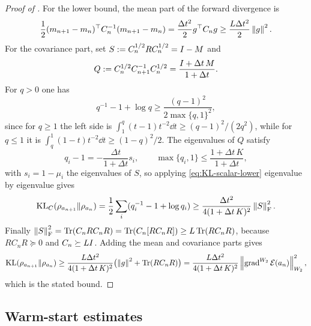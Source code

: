\begin{proof}[Proof of ]
    For the lower bound, the mean part of the forward divergence is
    \begin{equation*}
        \frac12(m_{n+1}-m_n)^\top C_n^{-1}(m_{n+1}-m_n)
        =\frac{\Delta t^2}2g^\top C_ng
        \geq\frac{L\Delta t^2}2\left\lVert g\right\rVert^2 .
    \end{equation*}
    For the covariance part, set $S:=C_n^{1/2}RC_n^{1/2}=I-M$ and
    \begin{equation*}
        Q:=C_n^{1/2}C_{n+1}^{-1}C_n^{1/2}=\frac{I+\Delta t\,M}{1+\Delta t}.
    \end{equation*}
    For $q>0$ one has
    \begin{equation}\label{eq:KL-scalar-lower}
        q^{-1}-1+\log q\geq\frac{(q-1)^2}{2\max\{q,1\}^2},
    \end{equation}
    since for $q\geq1$ the left side is $\int_1^q(t-1)t^{-2}\dd t\geq(q-1)^2/(2q^2)$, while for
    $q\leq1$ it is $\int_q^1(1-t)t^{-2}\dd t\geq(1-q)^2/2$. The eigenvalues of $Q$ satisfy
    \begin{equation*}
        q_i-1=-\frac{\Delta t}{1+\Delta t}s_i,
        \qquad
        \max\{q_i,1\}\leq\frac{1+\Delta t\,K}{1+\Delta t},
    \end{equation*}
    with $s_i=1-\mu_i$ the eigenvalues of $S$, so applying \eqref{eq:KL-scalar-lower}
    eigenvalue by eigenvalue gives
    \begin{equation*}
        \mathrm{KL}_C(\rho_{a_{n+1}}\|\rho_{a_n})
        =\frac12\sum_i(q_i^{-1}-1+\log q_i)
        \geq\frac{\Delta t^2}{4(1+\Delta t\,K)^2}\left\lVert S\right\rVert_{\mathrm{F}}^2 .
    \end{equation*}
    Finally $\left\lVert S\right\rVert_{\mathrm{F}}^2=\operatorname{Tr}(C_nRC_nR)=\operatorname{Tr}(C_n[RC_nR])\geq L\operatorname{Tr}(RC_nR)$, because
    $RC_nR\succeq0$ and $C_n\succeq LI$. Adding the mean and covariance parts gives
    \begin{equation*}
        \mathrm{KL}(\rho_{a_{n+1}}\|\rho_{a_n})
        \geq
        \frac{L\Delta t^2}{4(1+\Delta t\,K)^2}
        \bigl(\left\lVert g\right\rVert^2+\operatorname{Tr}(RC_nR)\bigr)
        =\frac{L\Delta t^2}{4(1+\Delta t\,K)^2}
        \left\lVert \operatorname{grad}^{W_2}\mathcal{E}(a_n)\right\rVert_{W_2}^2,
    \end{equation*}
    which is the stated bound.
\end{proof}

\subsection{Warm-start estimates}

